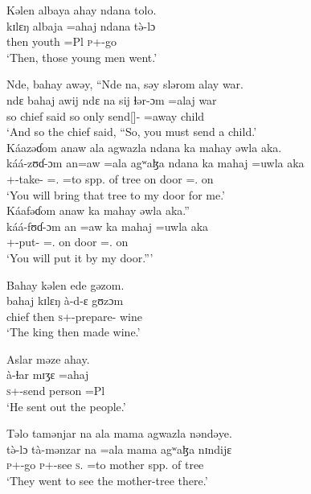 \ea     Kəlen  albaya  ahay  ndana  tolo.  \\
 \gll kɪlɛŋ  albaja   =ahaj  ndana  t\`ə-lɔ\\
 then   youth     =Pl     {\DEM}   \textsc{p}+{\PFV}-go\\ 
 \glt ‘Then, those young men went.’
 \z

\ea     Nde, bahay awəy,  “Nde na,  səy  slərom  alay  war.\\
 \gll ndɛ bahaj   awij     ndɛ  na  sij  ɬər-ɔm           =alaj         war\\
 so    chief  said  so  {\PSP}  only  {send[{\IMP}]-{\twoP}}  =away   child\\
  \glt ‘And so the chief said, “So, you must send a child.’\\
  
  \medskip
  Káazəɗom  anaw  ala  agwazla  ndana  ka  mahay  əwla  aka.\\
  \gll káá{}-zʊɗ{}-ɔm    an=aw    =ala    agʷaɮa    ndana    ka   mahaj    =uwla      aka\\
  {\twoP}+{\POT}-take-{\twoP}      {\DAT}={\oneS}.{\IO}  =to       {spp. of tree}   {\DEM}   on   door     ={\oneS}.{\POSS}  on\\
  \glt ‘You will bring that tree to my door for me.’\\
  
  \medskip
 Káafəɗom  anaw  ka  mahay  əwla  aka.”\\
 \gll káá{}-fʊɗ{}-ɔm          an  =aw      ka   mahaj   =uwla     aka\\
  {\twoP}+{\POT}-put-{\twoP}    {\DAT} ={\oneS}.{\IO}   on  door     ={\oneS}.{\POSS}   on\\
  \glt ‘You will put it by my door.”’ 
  \z

\ea Bahay  kəlen  ede  gəzom.  \\
 \gll bahaj  kɪlɛŋ  à-d-ɛ                 gʊzɔm\\
  chief  then  \textsc{s}+{\PFV}-prepare{}-{\CL}  wine\\
  \glt ‘The king then made wine.’
  \z

\ea   Aslar  məze  ahay.  \\
 \gll à-ɬar    mɪʒɛ  =ahaj\\
  \textsc{s}+{\PFV}-send    person  =Pl\\
 \glt ‘He sent out the people.’
 \z

\ea   Təlo  tamənjar  na  ala  mama  agwazla  nəndəye.\\ 
\gll t\`ə-lɔ             tà-mənzar            na      =ala  mama   agʷaɮa     nɪndijɛ\\
  \textsc{p}+{\PFV}-go  \textsc{p}+{\HOR}-see  \textsc{s}.{\DO}  =to     mother  {spp. of tree}  {\DEM}\\
  \glt ‘They went to see the mother-tree there.’
  \z

